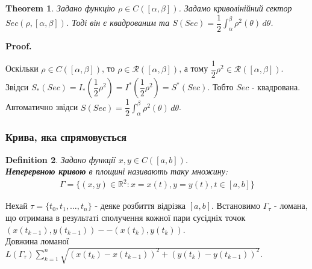 \documentclass[a4paper, 10pt]{article}
\makeatletter
\def\huge{\displaystyle}
\def\qed{$\blacksquare$}
\theoremstyle{theoremdd}
\newtheorem{theorem}{Theorem}[subsection]
\theoremstyle{theoremdd}
\newtheorem{definition}[theorem]{Definition}
\theoremstyle{theoremdd}
\theoremstyle{theoremdd}
\theoremstyle{theoremdd}
\theoremstyle{theoremdd}
\theoremstyle{theoremdd}
\theoremstyle{theoremdd}
\renewenvironment{proof}[1][Proof.\\]{\par
\pushQED{\hfill \qed}%
\normalfont \topsep6\p@\@plus6\p@\relax
\trivlist
\item\relax
{\bfseries
#1\@addpunct{.}}\hspace\labelsep\ignorespaces
}{%
\popQED\endtrivlist\@endpefalse
}
\makeatother
\begin{document}
\begin{theorem}
Задано функцію $\rho \in C([\alpha,\beta])$. Задамо криволінійний сектор $Sec(\rho, [\alpha,\beta])$. Тоді він є квадрованим та $S(Sec) = \dfrac{1}{2} \huge\int_\alpha^\beta \rho^2(\theta) \,d\theta$.
\end{theorem}

\begin{proof}
Оскільки $\rho \in C([\alpha,\beta])$, то $\rho \in \mathcal{R}([\alpha,\beta])$, а тому $\dfrac{1}{2}\rho^2 \in \mathcal{R}([\alpha,\beta])$. Звідси $S_*(Sec) = I_*\left( \dfrac{1}{2} \rho^2 \right) = I^*\left( \dfrac{1}{2} \rho^2 \right) = S^*(Sec)$. Тобто $Sec$ - квадрована.\\
Автоматично звідси $S(Sec) = \dfrac{1}{2} \huge\int_\alpha^\beta \rho^2(\theta) \, d\theta$.
\end{proof}

\subsubsection{Крива, яка спрямовується}
\begin{definition}
Задано функції $x,y \in C([a,b])$.\\
\textbf{Неперервною кривою} в площині називають таку множину:
\begin{align*}
\Gamma = \{ (x,y) \in \mathbb{R}^2 : x = x(t), y = y(t), t \in [a,b] \}
\end{align*}
\end{definition}
Нехай $\tau = \{t_0,t_1,\dots,t_n\}$ - деяке розбиття відрізка $[a,b]$. Встановимо $\Gamma_\tau$ - ломана, що отримана в результаті сполучення кожної пари сусідніх точок $(x(t_{k-1}), y(t_{k-1}))--(x(t_{k}),y(t_{k}))$.\\
Довжина ломаної $L(\Gamma_\tau) \huge\sum_{k=1}^n \sqrt{(x(t_{k})-x(t_{k-1}))^2 + (y(t_{k})-y(t_{k-1}))^2}$.
\begin{figure}[H]
\centering
{}
\end{figure}
\end{document}
